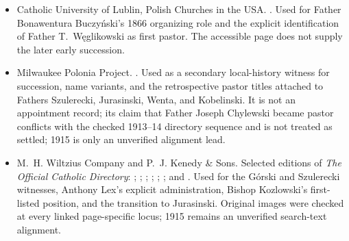 \begin{itemize}[leftmargin=1.35em,itemsep=0.2em,topsep=0.2em]
\item Catholic University of Lublin, Polish Churches in the USA. . Used for Father Bonawentura Buczy\'nski's 1866 organizing role and the explicit identification of Father T.~W\k{e}glikowski as first pastor. The accessible page does not supply the later early succession.
\item Milwaukee Polonia Project. . Used as a secondary local-history witness for succession, name variants, and the retrospective pastor titles attached to Fathers Szulerecki, Jurasinski, Wenta, and Kobelinski. It is not an appointment record; its claim that Father Joseph Chylewski became pastor conflicts with the checked 1913--14 directory sequence and is not treated as settled; 1915 is only an unverified alignment lead.
\item M.~H. Wiltzius Company and P.~J. Kenedy \& Sons. Selected editions of \emph{The Official Catholic Directory}: ; ; ; ; ; ; and . Used for the G\'orski and Szulerecki witnesses, Anthony Lex's explicit administration, Bishop Kozlowski's first-listed position, and the transition to Jurasinski. Original images were checked at every linked page-specific locus; 1915 remains an unverified search-text alignment.

\end{itemize}
